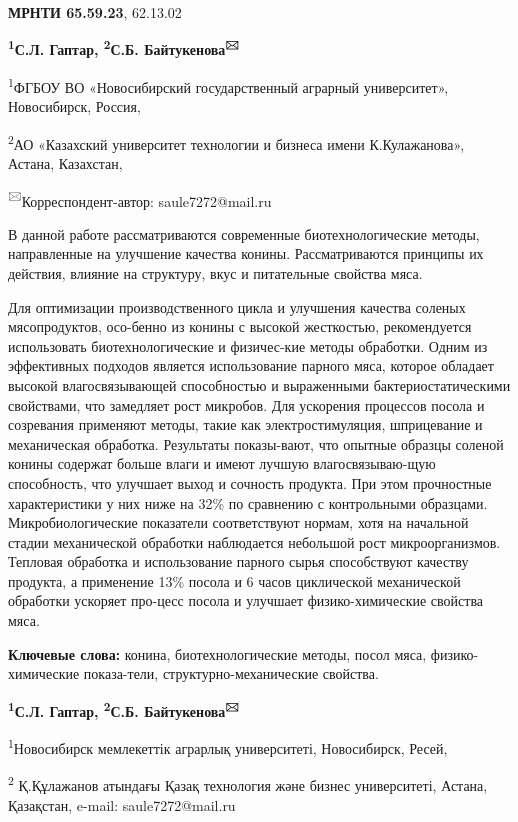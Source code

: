 \newpage
{\bfseries МРНТИ 65.59.23}, 62.13.02

\begin{center}

{\bfseries \textsuperscript{1}С.Л. Гаптар, \textsuperscript{2}С.Б.
Байтукенова\textsuperscript{🖂}}

\textsuperscript{1}ФГБОУ ВО «Новосибирский государственный аграрный
университет», Новосибирск, Россия,

\textsuperscript{2}АО «Казахский университет технологии и бизнеса имени
К.Кулажанова», Астана, Казахстан,
\end{center}

{\textsuperscript{🖂}}Корреспондент-автор: saule7272@mail.ru

В данной работе рассматриваются современные биотехнологические методы,
направленные на улучшение качества конины. Рассматриваются принципы их
действия, влияние на структуру, вкус и питательные свойства мяса.

Для оптимизации производственного цикла и улучшения качества соленых
мясопродуктов, осо-бенно из конины с высокой жесткостью, рекомендуется
использовать биотехнологические и физичес-кие методы обработки. Одним из
эффективных подходов является использование парного мяса, которое
обладает высокой влагосвязывающей способностью и выраженными
бактериостатическими свойствами, что замедляет рост микробов. Для
ускорения процессов посола и созревания применяют методы, такие как
электростимуляция, шприцевание и механическая обработка. Результаты
показы-вают, что опытные образцы соленой конины содержат больше влаги и
имеют лучшую влагосвязываю-щую способность, что улучшает выход и сочность
продукта. При этом прочностные характеристики у них ниже на 32\% по
сравнению с контрольными образцами. Микробиологические показатели
соответствуют нормам, хотя на начальной стадии механической обработки
наблюдается небольшой рост микроорганизмов. Тепловая обработка и
использование парного сырья способствуют качеству продукта, а применение
13\% посола и 6 часов циклической механической обработки ускоряет
про-цесс посола и улучшает физико-химические свойства мяса.

{\bfseries Ключевые слова:} конина, биотехнологические методы, посол мяса,
физико-химические показа-тели, структурно-механические свойства.

\begin{center}

{\bfseries \textsuperscript{1}С.Л. Гаптар, \textsuperscript{2}С.Б.
Байтукенова\textsuperscript{🖂}}

\textsuperscript{1}Новосибирск мемлекеттік аграрлық университеті,
Новосибирск, Ресей,

\textsuperscript{2} Қ.Құлажанов атындағы Қазақ технология және бизнес
университеті, Астана, Қазақстан, e-mail: saule7272@mail.ru
\end{center}


